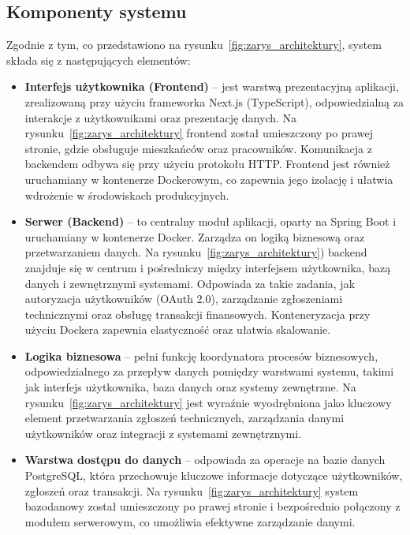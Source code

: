 \subsection{Komponenty systemu}
Zgodnie z tym, co przedstawiono na rysunku~\ref{fig:zarys_architektury}, system składa się z następujących elementów: 
\begin{itemize}

    \item \textbf{Interfejs użytkownika (Frontend)} -- jest warstwą prezentacyjną aplikacji, zrealizowaną przy użyciu frameworka Next.js (TypeScript), odpowiedzialną za interakcje z użytkownikami oraz prezentację danych. Na rysunku~\ref{fig:zarys_architektury} frontend został umieszczony po prawej stronie, gdzie obsługuje mieszkańców oraz pracowników. Komunikacja z backendem odbywa się przy użyciu protokołu HTTP. Frontend jest również uruchamiany w kontenerze Dockerowym, co zapewnia jego izolację i ułatwia wdrożenie w środowiskach produkcyjnych.

    \item \textbf{Serwer (Backend)} -- to centralny moduł aplikacji, oparty na Spring Boot i~ uruchamiany w kontenerze Docker. Zarządza on logiką biznesową oraz przetwarzaniem danych. Na rysunku~\ref{fig:zarys_architektury}) backend znajduje się w centrum i pośredniczy między interfejsem użytkownika, bazą danych i zewnętrznymi systemami. Odpowiada za takie zadania, jak autoryzacja użytkowników (OAuth 2.0), zarządzanie zgłoszeniami technicznymi oraz obsługę transakcji finansowych. Konteneryzacja przy użyciu Dockera zapewnia elastyczność oraz ułatwia skalowanie.

    \item \textbf{Logika biznesowa} -- pełni funkcję koordynatora procesów biznesowych, odpowiedzialnego za przepływ danych pomiędzy warstwami systemu, takimi jak interfejs użytkownika, baza danych oraz systemy zewnętrzne. Na rysunku~\ref{fig:zarys_architektury} jest wyraźnie wyodrębniona jako kluczowy element przetwarzania zgłoszeń technicznych, zarządzania danymi użytkowników oraz integracji z systemami zewnętrznymi.

    \item \textbf{Warstwa dostępu do danych} -- odpowiada za operacje na bazie danych PostgreSQL, która przechowuje kluczowe informacje dotyczące użytkowników, zgłoszeń oraz transakcji. Na rysunku~\ref{fig:zarys_architektury} system bazodanowy został umieszczony po prawej stronie i bezpośrednio połączony z modułem serwerowym, co umożliwia efektywne zarządzanie danymi.


\end{itemize}
